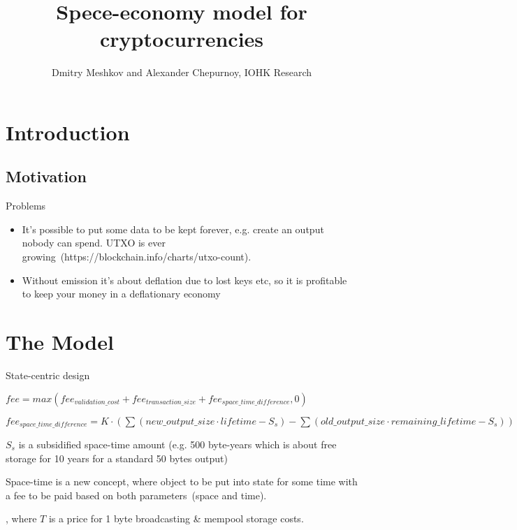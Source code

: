 \documentclass[]{article}   %
\begin{document}
\title{Spece-economy model for cryptocurrencies}
\author{Dmitry Meshkov and Alexander Chepurnoy, IOHK Research}
\maketitle

\section{Introduction}

\subsection{Motivation}

Problems
\begin{itemize}
  \item It's possible to put some data to be kept forever, e.g. create an output nobody can spend. UTXO is ever growing~(https://blockchain.info/charts/utxo-count).
  \item Without emission it's about deflation due to lost keys etc, so it is profitable to keep your money in a deflationary economy
\end{itemize}


\section{The Model}

State-centric design

$fee = max(fee_{validation\_cost} + fee_{transaction\_size} + fee_{space\_time\_difference}, 0)$

$fee_{space\_time\_difference} = K \cdot (\sum{(new\_output\_size \cdot lifetime - S_s)} - \sum{(old\_output\_size \cdot remaining\_lifetime - S_s)})$

$S_s$ is a subsidified space-time amount (e.g. 500 byte-years which is about free storage for 10 years for a standard 50 bytes output)

Space-time is a new concept, where object to be put into state for some time with a fee to be paid based on both parameters~(space and time). 




, where $T$ is a price for 1 byte broadcasting \& mempool storage costs.
\end{document}
